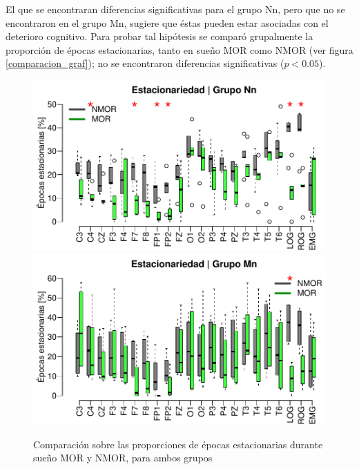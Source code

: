 El que se encontraran diferencias significativas para el grupo Nn, pero que no se encontraron en el
grupo Mn, sugiere que éstas pueden estar asociadas con el deterioro cognitivo.
Para probar tal hipótesis se comparó grupalmente la proporción de épocas estacionarias, tanto en
sueño MOR como NMOR (ver figura \ref{comparacion_graf}); no se encontraron diferencias
significativas ($p<0.05$).

\begin{figure}
\centering
\includegraphics[width=\linewidth]
{./img_ejemplos/Comparacion_etapas_normal_MOR_vs_NMOR_v2.pdf} \\
\includegraphics[width=\linewidth]
{./img_ejemplos/Comparacion_etapas_pdc_MOR_vs_NMOR_v2.pdf} \\
\caption{Comparación sobre las proporciones de épocas estacionarias durante sueño MOR y NMOR, para 
ambos grupos}
\label{comparacion_verde}
\end{figure}

